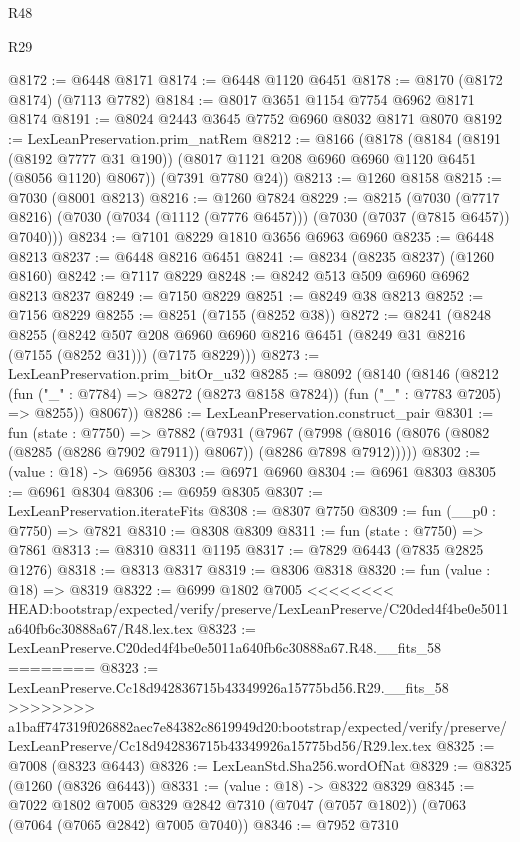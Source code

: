 \begin{lexlean}{R48}
\begin{lexlean}{R29}
\begin{coremodule}
{{{{{{{{{{{{{{{{{{{{{{{{{{{{{{{{{{{{{{{{{{{{{{{{{{{{{{{{{{{{{{{{{{{{{{{{{{{{{{{{{{{{{{{{{{{{{{{{{{{{{{{{{{{{{{{{{{{{{{{{{{{{{{{{{{{{{{{{{{{{{{{{{{{{{{{{{{{{{{{{{{{{{{{{{{{{{{{{{{{{{{{{{{{{{{{{{{{{{{{{{{{{{{{{{{{{{{{{{{@8172 := @6448 @8171
@8174 := @6448 @1120 @6451
@8178 := @8170 (@8172 @8174) (@7113 @7782)
@8184 := @8017 @3651 @1154 @7754 @6962 @8171 @8174
@8191 := @8024 @2443 @3645 @7752 @6960 @8032 @8171 @8070
@8192 := LexLeanPreservation.prim_natRem
@8212 := @8166
    (@8178
      (@8184
        (@8191 (@8192 @7777 @31 @190))
        (@8017 @1121 @208 @6960 @6960 @1120 @6451 (@8056 @1120) @8067))
      (@7391 @7780 @24))
@8213 := @1260 @8158
@8215 := @7030 (@8001 @8213)
@8216 := @1260 @7824
@8229 := @8215
    (@7030 (@7717 @8216) (@7030 (@7034 (@1112 (@7776 @6457))) (@7030 (@7037 (@7815 @6457)) @7040)))
@8234 := @7101 @8229 @1810 @3656 @6963 @6960
@8235 := @6448 @8213
@8237 := @6448 @8216 @6451
@8241 := @8234 (@8235 @8237) (@1260 @8160)
@8242 := @7117 @8229
@8248 := @8242 @513 @509 @6960 @6962 @8213 @8237
@8249 := @7150 @8229
@8251 := @8249 @38 @8213
@8252 := @7156 @8229
@8255 := @8251 (@7155 (@8252 @38))
@8272 := @8241
    (@8248
      @8255
      (@8242 @507 @208 @6960 @6960 @8216 @6451 (@8249 @31 @8216 (@7155 (@8252 @31))) (@7175 @8229)))
@8273 := LexLeanPreservation.prim_bitOr_u32
@8285 := @8092
    (@8140
      (@8146
        (@8212 (fun ("_" : @7784) => @8272 (@8273 @8158 @7824)) (fun ("_" : @7783 @7205) => @8255))
        @8067))
@8286 := LexLeanPreservation.construct_pair
@8301 := fun (state : @7750) =>
  @7882
    (@7931
      (@7967 (@7998 (@8016 (@8076 (@8082 (@8285 (@8286 @7902 @7911)) @8067)) (@8286 @7898 @7912)))))
@8302 := (value : @18) -> @6956
@8303 := @6971 @6960
@8304 := @6961 @8303
@8305 := @6961 @8304
@8306 := @6959 @8305
@8307 := LexLeanPreservation.iterateFits
@8308 := @8307 @7750
@8309 := fun (__p0 : @7750) => @7821
@8310 := @8308 @8309
@8311 := fun (state : @7750) => @7861
@8313 := @8310 @8311 @1195
@8317 := @7829 @6443 (@7835 @2825 @1276)
@8318 := @8313 @8317
@8319 := @8306 @8318
@8320 := fun (value : @18) => @8319
@8322 := @6999 @1802 @7005
<<<<<<<< HEAD:bootstrap/expected/verify/preserve/LexLeanPreserve/C20ded4f4be0e5011a640fb6c30888a67/R48.lex.tex
@8323 := LexLeanPreserve.C20ded4f4be0e5011a640fb6c30888a67.R48.__fits_58
========
@8323 := LexLeanPreserve.Cc18d942836715b43349926a15775bd56.R29.__fits_58
>>>>>>>> a1baff747319f026882aec7e84382c8619949d20:bootstrap/expected/verify/preserve/LexLeanPreserve/Cc18d942836715b43349926a15775bd56/R29.lex.tex
@8325 := @7008 (@8323 @6443)
@8326 := LexLeanStd.Sha256.wordOfNat
@8329 := @8325 (@1260 (@8326 @6443))
@8331 := (value : @18) -> @8322 @8329
@8345 := @7022
    @1802
    @7005
    @8329
    @2842
    @7310
    (@7047 (@7057 @1802))
    (@7063 (@7064 (@7065 @2842) @7005 @7040))
@8346 := @7952 @7310
}}}}}}}}}}}}}}}}}}}}}}}}}}}}}}}}}}}}}}}}}}}}}}}}}}}}}}}}}}}}}}}}}}}}}}}}}}}}}}}}}}}}}}}}}}}}}}}}}}}}}}}}}}}}}}}}}}}}}}}}}}}}}}}}}}}}}}}}}}}}}}}}}}}}}}}}}}}}}}}}}}}}}}}}}}}}}}}}}}}}}}}}}}}}}}}}}}}}}}}}}}}}}}}}}}}}}}}}}}
\end{coremodule}
\end{lexlean}
\end{lexlean}
